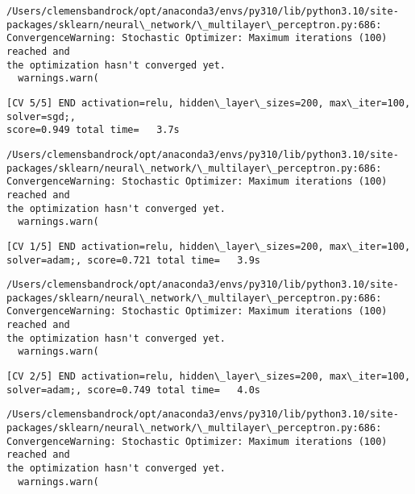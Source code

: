 \documentclass[11pt]{article}
\begin{document}
    \begin{Verbatim}[commandchars=\\\{\}]
/Users/clemensbandrock/opt/anaconda3/envs/py310/lib/python3.10/site-
packages/sklearn/neural\_network/\_multilayer\_perceptron.py:686:
ConvergenceWarning: Stochastic Optimizer: Maximum iterations (100) reached and
the optimization hasn't converged yet.
  warnings.warn(
    \end{Verbatim}

    \begin{Verbatim}[commandchars=\\\{\}]
[CV 5/5] END activation=relu, hidden\_layer\_sizes=200, max\_iter=100, solver=sgd;,
score=0.949 total time=   3.7s
    \end{Verbatim}

    \begin{Verbatim}[commandchars=\\\{\}]
/Users/clemensbandrock/opt/anaconda3/envs/py310/lib/python3.10/site-
packages/sklearn/neural\_network/\_multilayer\_perceptron.py:686:
ConvergenceWarning: Stochastic Optimizer: Maximum iterations (100) reached and
the optimization hasn't converged yet.
  warnings.warn(
    \end{Verbatim}

    \begin{Verbatim}[commandchars=\\\{\}]
[CV 1/5] END activation=relu, hidden\_layer\_sizes=200, max\_iter=100,
solver=adam;, score=0.721 total time=   3.9s
    \end{Verbatim}

    \begin{Verbatim}[commandchars=\\\{\}]
/Users/clemensbandrock/opt/anaconda3/envs/py310/lib/python3.10/site-
packages/sklearn/neural\_network/\_multilayer\_perceptron.py:686:
ConvergenceWarning: Stochastic Optimizer: Maximum iterations (100) reached and
the optimization hasn't converged yet.
  warnings.warn(
    \end{Verbatim}

    \begin{Verbatim}[commandchars=\\\{\}]
[CV 2/5] END activation=relu, hidden\_layer\_sizes=200, max\_iter=100,
solver=adam;, score=0.749 total time=   4.0s
    \end{Verbatim}

    \begin{Verbatim}[commandchars=\\\{\}]
/Users/clemensbandrock/opt/anaconda3/envs/py310/lib/python3.10/site-
packages/sklearn/neural\_network/\_multilayer\_perceptron.py:686:
ConvergenceWarning: Stochastic Optimizer: Maximum iterations (100) reached and
the optimization hasn't converged yet.
  warnings.warn(
    \end{Verbatim}
\end{document}
